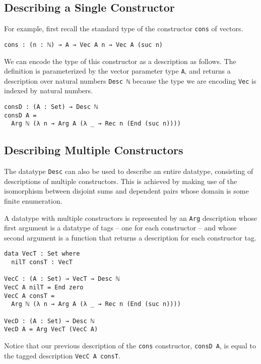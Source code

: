 \documentclass[preprint,nonatbib]{sigplanconf}
\begin{document}
\subsection{Describing a Single Constructor}

For example, first recall the standard type of the
constructor {\tt cons} of vectors.

\begin{verbatim}
cons : (n : ℕ) → A → Vec A n → Vec A (suc n)
\end{verbatim}

We can encode the type of this constructor as a description as
follows. The definition is parameterized by the vector parameter
type {\tt A}, and returns a description over natural numbers
{\tt Desc ℕ} because the type we are encoding {\tt Vec}
is indexed by natural numbers.

\begin{verbatim}
consD : (A : Set) → Desc ℕ
consD A =
  Arg ℕ (λ n → Arg A (λ _ → Rec n (End (suc n))))
\end{verbatim}

\subsection{Describing Multiple Constructors}
\label{sec:background:multiple}

The datatype {\tt Desc} can also be used to describe an entire
datatype, consisting of descriptions of multiple constructors.
This is achieved by making use of the isomorphism between disjoint
sums and dependent pairs whose domain is some finite enumeration.

A datatype with multiple constructors is represented by an
{\tt Arg} description whose first argument is a datatype of tags
-- one for each constructor -- and whose second argument is
a function that returns a description for each constructor tag.

\begin{verbatim}
data VecT : Set where
  nilT consT : VecT

VecC : (A : Set) → VecT → Desc ℕ
VecC A nilT = End zero
VecC A consT =
  Arg ℕ (λ n → Arg A (λ _ → Rec n (End (suc n))))

VecD : (A : Set) → Desc ℕ
VecD A = Arg VecT (VecC A)
\end{verbatim}

Notice that our previous description of the {\tt cons} constructor,
{\tt consD A}, is equal to the tagged description
{\tt VecC A consT}.
\end{document}

